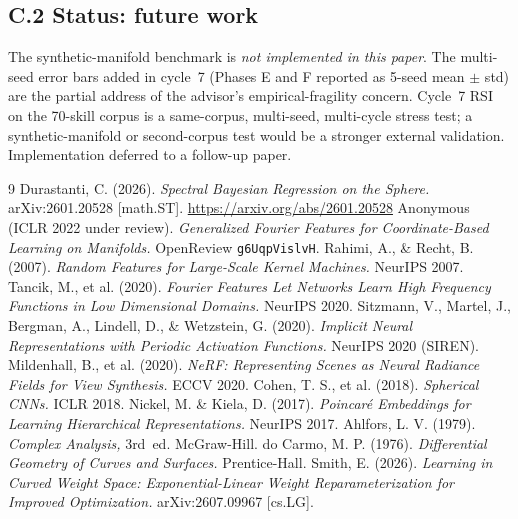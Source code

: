 \documentclass[11pt,a4paper]{article}
\begin{document}
\subsection{C.2 Status: future work}
The synthetic-manifold benchmark is \emph{not implemented in this paper}. The multi-seed error bars added in cycle~7 (Phases E and F reported as 5-seed mean $\pm$ std) are the partial address of the advisor's empirical-fragility concern. Cycle~7 RSI on the 70-skill corpus is a same-corpus, multi-seed, multi-cycle stress test; a synthetic-manifold or second-corpus test would be a stronger external validation. Implementation deferred to a follow-up paper.

\begin{thebibliography}{9}
 Durastanti, C. (2026). \emph{Spectral Bayesian Regression on the Sphere.} arXiv:2601.20528 [math.ST]. \url{https://arxiv.org/abs/2601.20528}
 Anonymous (ICLR 2022 under review). \emph{Generalized Fourier Features for Coordinate-Based Learning on Manifolds.} OpenReview \texttt{g6UqpVislvH}.
 Rahimi, A., \& Recht, B. (2007). \emph{Random Features for Large-Scale Kernel Machines.} NeurIPS 2007.
 Tancik, M., et al. (2020). \emph{Fourier Features Let Networks Learn High Frequency Functions in Low Dimensional Domains.} NeurIPS 2020.
 Sitzmann, V., Martel, J., Bergman, A., Lindell, D., \& Wetzstein, G. (2020). \emph{Implicit Neural Representations with Periodic Activation Functions.} NeurIPS 2020 (SIREN).
 Mildenhall, B., et al. (2020). \emph{NeRF: Representing Scenes as Neural Radiance Fields for View Synthesis.} ECCV 2020.
 Cohen, T. S., et al. (2018). \emph{Spherical CNNs.} ICLR 2018.
 Nickel, M. \& Kiela, D. (2017). \emph{Poincar\'e Embeddings for Learning Hierarchical Representations.} NeurIPS 2017.
 Ahlfors, L. V. (1979). \emph{Complex Analysis,} 3rd~ed. McGraw-Hill.
 do Carmo, M. P. (1976). \emph{Differential Geometry of Curves and Surfaces.} Prentice-Hall.
 Smith, E. (2026). \emph{Learning in Curved Weight Space: Exponential-Linear Weight Reparameterization for Improved Optimization.} arXiv:2607.09967 [cs.LG].
\end{thebibliography}
\end{document}
